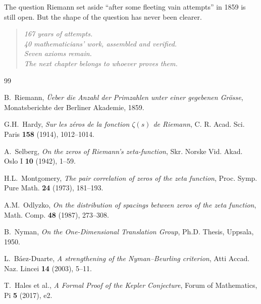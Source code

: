 \documentclass[11pt,a4paper]{article}
\begin{document}
The question Riemann set aside ``after some fleeting vain attempts''
in 1859 is still open. But the shape of the question has never
been clearer.

\begin{quote}
\emph{167 years of attempts.\\
40 mathematicians' work, assembled and verified.\\
Seven axioms remain.\\
The next chapter belongs to whoever proves them.}
\end{quote}

\begin{thebibliography}{99}

B.~Riemann, \emph{\"Ueber die Anzahl der Primzahlen unter einer
gegebenen Gr\"osse}, Monatsberichte der Berliner Akademie, 1859.

G.H.~Hardy, \emph{Sur les z\'eros de la fonction $\zeta(s)$ de
Riemann}, C. R. Acad. Sci. Paris \textbf{158} (1914), 1012--1014.

A.~Selberg, \emph{On the zeros of Riemann's zeta-function},
Skr. Norske Vid. Akad. Oslo I \textbf{10} (1942), 1--59.

H.L.~Montgomery, \emph{The pair correlation of zeros of the zeta
function}, Proc. Symp. Pure Math. \textbf{24} (1973), 181--193.

A.M.~Odlyzko, \emph{On the distribution of spacings between zeros
of the zeta function}, Math. Comp. \textbf{48} (1987), 273--308.

B.~Nyman, \emph{On the One-Dimensional Translation Group},
Ph.D. Thesis, Uppsala, 1950.

L.~B\'aez-Duarte, \emph{A strengthening of the Nyman--Beurling
criterion}, Atti Accad. Naz. Lincei \textbf{14} (2003), 5--11.

T.~Hales et al., \emph{A Formal Proof of the Kepler Conjecture},
Forum of Mathematics, Pi \textbf{5} (2017), e2.

\end{thebibliography}
\end{document}

